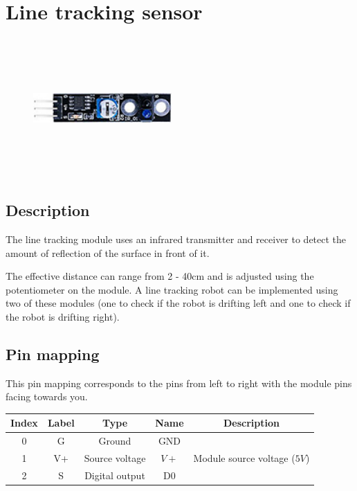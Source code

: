 \section{Line tracking sensor}
\begin{figure}[H]
    \centering
    \includegraphics[angle=0, keepaspectratio=true, scale=1, width=200px, height=200px]{images/line_tracking.jpg}
\end{figure}
\subsection*{Description}
The line tracking module uses an infrared transmitter and receiver to detect the amount of reflection of the surface in front of it.

The effective distance can range from 2 - 40cm and is adjusted using the potentiometer on the module. A line tracking robot can be implemented using two of these modules (one to check if the robot is drifting left and one to check if the robot is drifting right).

\subsection*{Pin mapping}
This pin mapping corresponds to the pins from left to right with the module pins facing towards you.
\begin{table}[H]
    \centering
    \begin{tabular}{|c|c|c|c|c|}
    \hline
    Index &Label &Type &Name &Description\\ \hline
    0 &G &Ground &GND & \\ \hline
    1 &V+ &Source voltage &$V+$ &Module source voltage ($5V$)\\ \hline
    2 &S &Digital output &D0 &\\ \hline
    \end{tabular}
\end{table}
